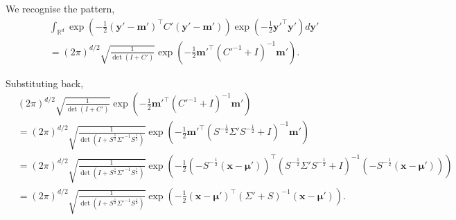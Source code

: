 \documentclass[oneside, 11pt]{article}
\begin{document}
    We recognise the pattern, \begin{align*}
        &\int_{\mathbb{R}^d} \exp\left(-\frac12 \left(\mathbf{y}' - \mathbf{m}'\right)^\top C' \left(\mathbf{y}' - \mathbf{m}'\right) \right) \exp\left(-\frac12 \mathbf{y}'^\top \mathbf{y}' \right)  d\mathbf{y}' \\
        &= (2 \pi)^{d/2} \sqrt{\frac{1}{\det(I + C')}} \exp\left(-\frac{1}{2}\mathbf{m}'^\top \left(C'^{-1} + I\right)^{-1}\mathbf{m}'\right) \text{.}
    \end{align*}

    Substituting back,\begin{align*}
        &(2 \pi)^{d/2} \sqrt{\frac{1}{\det(I + C')}} \exp\left(-\frac{1}{2}\mathbf{m}'^\top \left(C'^{-1} + I\right)^{-1}\mathbf{m}'\right) \\
        &= (2 \pi)^{d/2} \sqrt{\frac{1}{\det\left(I + S^{\frac12}\Sigma'^{-1}S^{\frac12}\right)}} \exp\left(-\frac{1}{2}\mathbf{m}'^\top \left(S^{-\frac12}\Sigma'S^{-\frac12} + I\right)^{-1}\mathbf{m}'\right) \\
        &= (2 \pi)^{d/2} \sqrt{\frac{1}{\det\left(I + S^{\frac12}\Sigma'^{-1}S^{\frac12}\right)}} \exp\left(-\frac{1}{2}\left(-S^{-\frac12} \left(\mathbf{x} - \bm{\mu}'\right)\right)^\top \left(S^{-\frac12}\Sigma'S^{-\frac12} + I\right)^{-1}\left(-S^{-\frac12} \left(\mathbf{x} - \bm{\mu}'\right)\right)\right) \\
        &= (2 \pi)^{d/2} \sqrt{\frac{1}{\det\left(I + S^{\frac12}\Sigma'^{-1}S^{\frac12}\right)}} \exp\left(-\frac{1}{2}\left(\mathbf{x} - \bm{\mu}'\right)^\top \left(\Sigma' + S\right)^{-1}\left(\mathbf{x} - \bm{\mu}'\right)\right) \text{.}
    \end{align*}
\end{document}
